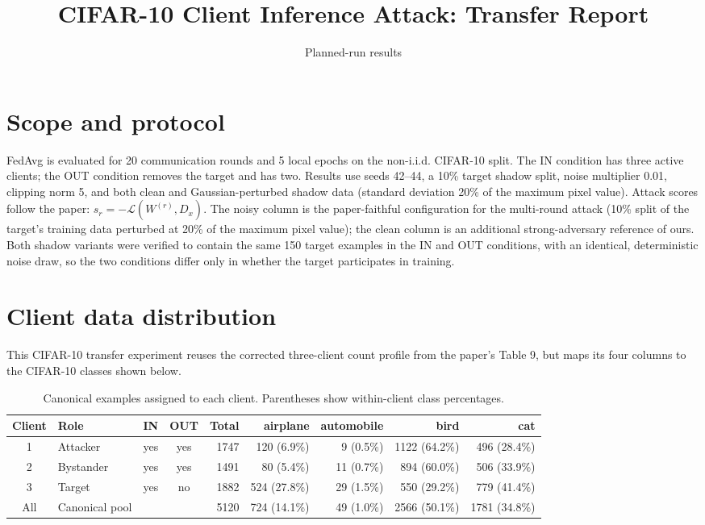 \documentclass[10pt]{article}
\title{CIFAR-10 Client Inference Attack: Transfer Report}
\author{Planned-run results}
\date{}
\begin{document}
\maketitle
\thispagestyle{empty}

\section*{Scope and protocol}
FedAvg is evaluated for 20 communication rounds and 5 local epochs on the non-i.i.d. CIFAR-10 split.
The IN condition has three active clients; the OUT condition removes the target and has two.
Results use seeds 42--44, a 10\% target shadow split, noise multiplier 0.01, clipping norm 5,
and both clean and Gaussian-perturbed shadow data (standard deviation 20\% of the maximum pixel value).
Attack scores follow the paper: $s_r=-\mathcal{L}(W^{(r)},D_x)$.
The noisy column is the paper-faithful configuration for the multi-round attack (10\% split of the
target's training data perturbed at 20\% of the maximum pixel value); the clean column is an
additional strong-adversary reference of ours. Both shadow variants were verified to contain the same
150 target examples in the IN and OUT conditions, with an identical, deterministic noise draw, so the
two conditions differ only in whether the target participates in training.

\section*{Client data distribution}
This CIFAR-10 transfer experiment reuses the corrected three-client count profile from the paper's Table 9, but maps its four columns to the CIFAR-10 classes shown below.

\begin{table}[h]
\centering
\caption{Canonical examples assigned to each client. Parentheses show within-client class percentages.}
\begin{tabular}{clccrrrrr}
\toprule
Client & Role & IN & OUT & Total & airplane & automobile & bird & cat \\
\midrule
1 & Attacker & yes & yes & 1747 & 120 (6.9\%) & 9 (0.5\%) & 1122 (64.2\%) & 496 (28.4\%) \\
2 & Bystander & yes & yes & 1491 & 80 (5.4\%) & 11 (0.7\%) & 894 (60.0\%) & 506 (33.9\%) \\
3 & Target & yes & no & 1882 & 524 (27.8\%) & 29 (1.5\%) & 550 (29.2\%) & 779 (41.4\%) \\
\midrule
All & Canonical pool & & & 5120 & 724 (14.1\%) & 49 (1.0\%) & 2566 (50.1\%) & 1781 (34.8\%) \\
\bottomrule
\end{tabular}
\end{table}
\end{document}
